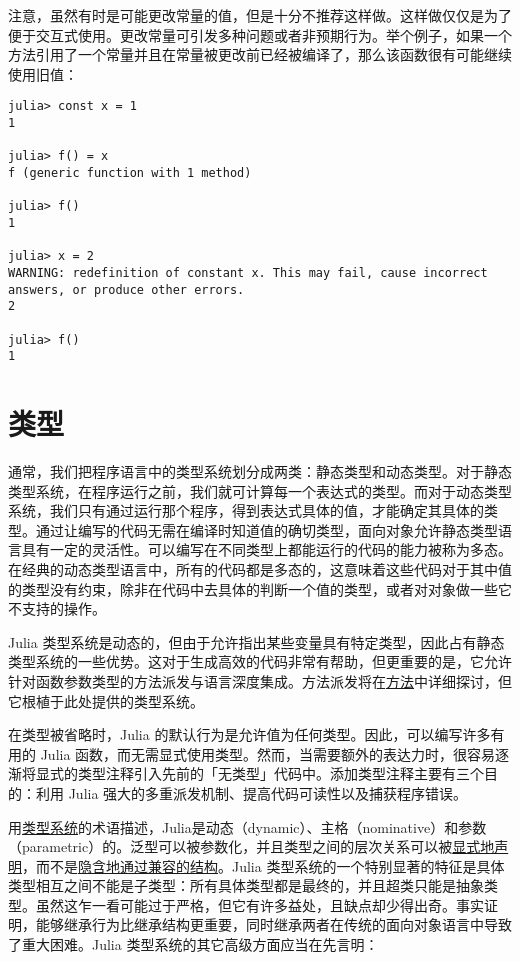 注意，虽然有时是可能更改常量的值，但是十分不推荐这样做。这样做仅仅是为了便于交互式使用。更改常量可引发多种问题或者非预期行为。举个例子，如果一个方法引用了一个常量并且在常量被更改前已经被编译了，那么该函数很有可能继续使用旧值：




\begin{verbatim}
julia> const x = 1
1

julia> f() = x
f (generic function with 1 method)

julia> f()
1

julia> x = 2
WARNING: redefinition of constant x. This may fail, cause incorrect answers, or produce other errors.
2

julia> f()
1
\end{verbatim}



\hypertarget{2141690262982725665}{}


\chapter{类型}



通常，我们把程序语言中的类型系统划分成两类：静态类型和动态类型。对于静态类型系统，在程序运行之前，我们就可计算每一个表达式的类型。而对于动态类型系统，我们只有通过运行那个程序，得到表达式具体的值，才能确定其具体的类型。通过让编写的代码无需在编译时知道值的确切类型，面向对象允许静态类型语言具有一定的灵活性。可以编写在不同类型上都能运行的代码的能力被称为多态。在经典的动态类型语言中，所有的代码都是多态的，这意味着这些代码对于其中值的类型没有约束，除非在代码中去具体的判断一个值的类型，或者对对象做一些它不支持的操作。



Julia 类型系统是动态的，但由于允许指出某些变量具有特定类型，因此占有静态类型系统的一些优势。这对于生成高效的代码非常有帮助，但更重要的是，它允许针对函数参数类型的方法派发与语言深度集成。方法派发将在\hyperlink{3842379394166369470}{方法}中详细探讨，但它根植于此处提供的类型系统。



在类型被省略时，Julia 的默认行为是允许值为任何类型。因此，可以编写许多有用的 Julia 函数，而无需显式使用类型。然而，当需要额外的表达力时，很容易逐渐将显式的类型注释引入先前的「无类型」代码中。添加类型注释主要有三个目的：利用 Julia 强大的多重派发机制、提高代码可读性以及捕获程序错误。



用\href{https://zh.wikipedia.org/wiki/类型系统}{类型系统}的术语描述，Julia是动态（dynamic）、主格（nominative）和参数（parametric）的。泛型可以被参数化，并且类型之间的层次关系可以被\href{https://en.wikipedia.org/wiki/Nominal\_type\_system}{显式地声明}，而不是\href{https://en.wikipedia.org/wiki/Structural\_type\_system}{隐含地通过兼容的结构}。Julia 类型系统的一个特别显著的特征是具体类型相互之间不能是子类型：所有具体类型都是最终的，并且超类只能是抽象类型。虽然这乍一看可能过于严格，但它有许多益处，且缺点却少得出奇。事实证明，能够继承行为比继承结构更重要，同时继承两者在传统的面向对象语言中导致了重大困难。Julia 类型系统的其它高级方面应当在先言明：




